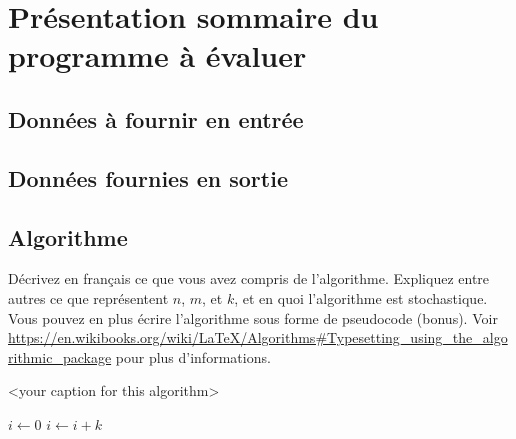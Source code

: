 
\section{Présentation sommaire du programme à évaluer}

\subsection{Données à fournir en entrée}

\subsection{Données fournies en sortie}

\subsection{Algorithme}

Décrivez en français ce que vous avez compris de l'algorithme. Expliquez entre autres ce que représentent $n$, $m$, et $k$, et en quoi l'algorithme est stochastique. Vous pouvez en plus écrire l'algorithme sous forme de pseudocode (bonus). Voir  \url{https://en.wikibooks.org/wiki/LaTeX/Algorithms#Typesetting_using_the_algorithmic_package} pour plus d'informations.

\begin{algorithm}
	\caption{<your caption for this algorithm>}
	\label{<your label for references later in your document>}
	\begin{algorithmic}
		\State $i\gets 0$
		\Else
		\State $i\gets i+k$
		\EndIf
		\EndIf
	\end{algorithmic}
\end{algorithm}
